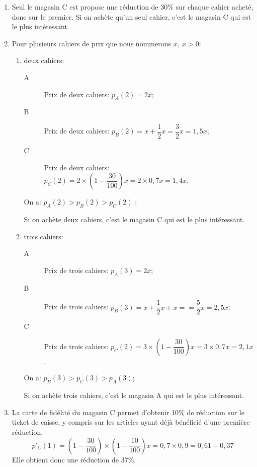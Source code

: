 \begin{enumerate}
\item Seul le magasin C est propose une réduction de 30\%{} sur chaque cahier acheté, donc sur le premier. Si on achète qu'un seul cahier, c'est le magasin C qui est le plus intéressant.
\item Pour plusieurs cahiers de prix que nous nommerons $x,\ x > 0$:
\begin{enumerate}
\item deux cahiers: 
\begin{description}
\item[A] Prix de deux cahiers: $p_A(2)=2x$;
\item[B] Prix de deux cahiers: $p_B(2)=x+\dfrac{1}{2}x=\dfrac{3}{2}x=1,5x$;
\item[C] Prix de deux cahiers: $p_C(2)=2\times\left(1-\dfrac{30}{100}\right)x=2\times 0,7x=1,4x$.
\end{description}
On a: $p_A(2) > p_B(2) > p_C(2)$ ;

Si on achète deux cahiers, c'est le magasin C qui est le plus intéressant.
\item trois cahiers:
\begin{description}
\item[A] Prix de trois cahiers: $p_A(3)=2x$;
\item[B] Prix de trois cahiers: $p_B(3)=x+\dfrac{1}{2}x+x==\dfrac{5}{2}x=2,5x$;
\item[C] Prix de trois cahiers: $p_C(2)=3\times\left(1-\dfrac{30}{100}\right)x=3\times 0,7x=2,1x$.
\end{description}
On a: $p_B(3)>p_C(3)>p_A(3)$;

Si on achète trois cahiers, c'est le magasin A qui est le plus intéressant.
\end{enumerate}
\item La carte de fidélité du magasin C permet d'obtenir 10\%{} de réduction sur le ticket de caisse, y compris sur les articles ayant déjà bénéficié d'une première réduction.
\[
p'_C(1)=\left(1-\dfrac{30}{100}\right)\times\left(1-\dfrac{10}{100}\right)x=0,7\times 0,9=0,61-0,37
\]
Elle obtient donc une réduction de 37\%.
\end{enumerate}

\vspace{0,5cm}

